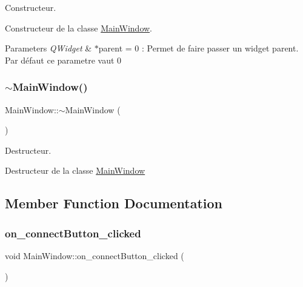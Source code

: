 Constructeur. 

Constructeur de la classe \mbox{\hyperlink{classMainWindow}{Main\+Window}}.


\begin{DoxyParams}{Parameters}
{\em Q\+Widget} & $\ast$parent = 0 \+: Permet de faire passer un widget parent. Par défaut ce parametre vaut 0 \\
\hline
\end{DoxyParams}
\mbox{\label{classMainWindow_ae98d00a93bc118200eeef9f9bba1dba7}} 
\subsubsection{\texorpdfstring{$\sim$\+Main\+Window()}{~MainWindow()}}
{\footnotesize\ttfamily Main\+Window\+::$\sim$\+Main\+Window (\begin{DoxyParamCaption}{ }\end{DoxyParamCaption})}



Destructeur. 

Destructeur de la classe \mbox{\hyperlink{classMainWindow}{Main\+Window}} 

\subsection{Member Function Documentation}
\mbox{\label{classMainWindow_a55cd52e7b00aff669290588f8affea5a}} 
\subsubsection{\texorpdfstring{on\+\_\+connect\+Button\+\_\+clicked}{on\_connectButton\_clicked}}
{\footnotesize\ttfamily void Main\+Window\+::on\+\_\+connect\+Button\+\_\+clicked (\begin{DoxyParamCaption}{ }\end{DoxyParamCaption})\hspace{0.3cm}{\ttfamily [slot]}}



